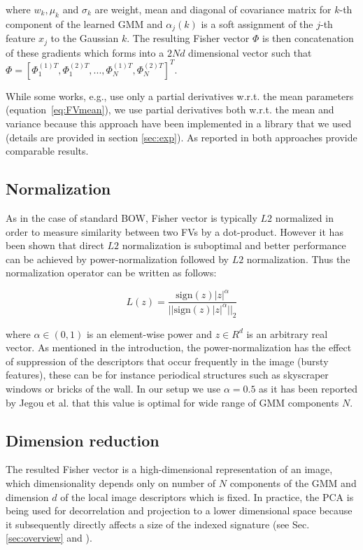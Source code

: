 \documentclass[table]{article} %
\newcommand\abs[1]{\left|#1\right|}
\newcommand\norm[1]{||#1||_2}
\begin{document}
		\noindent
		where $w_k, \mu_k$ and $\sigma_k$ are weight, mean and diagonal of covariance matrix for $k$-th component of the learned GMM and $\alpha_j(k)$ is a soft assignment of the $j$-th feature $x_j$ to the Gaussian $k$. The resulting Fisher vector  $\Phi$ is then concatenation of these gradients which forms into a $2Nd$ dimensional vector such that $\Phi=[\Phi^{(1)T}_1,\Phi^{(2)T}_1,...,\Phi^{(1)T}_N,\Phi^{(2)T}_N]^T$.

		While some works, e.g.\cite{Perronnin2010}, use only a partial derivatives w.r.t. the mean parameters (equation~\eqref{eq:FVmean}), we use partial derivatives both w.r.t. the mean and variance because this approach have been implemented in a library that we used (details are provided in section \ref{sec:exp}). As reported in \cite{Jegou2010} both approaches provide comparable results.

		\subsection{Normalization}
			As in the case of standard BOW, Fisher vector is typically $L2$ normalized in order to measure similarity between two FVs by a dot-product. However it has been shown that direct $L2$ normalization is suboptimal and better performance can be achieved by power-normalization followed by $L2$ normalization. Thus the normalization operator can be written as follows:
			
			\begin{equation}
				L(z)=\dfrac{\text{sign} (z) \abs{z}^\alpha}{\norm{\text{sign}(z) \abs{z}^\alpha}}
				\label{eq:Loperator}
			\end{equation}

			\noindent
			where $\alpha \in (0,1)$ is an element-wise power and $z \in R^d$ is an arbitrary real vector. As mentioned in the introduction, the power-normalization has the effect of suppression of the descriptors that occur frequently in the image (bursty features), these can be for instance periodical structures such as skyscraper windows or bricks of the wall. In our setup we use $\alpha=0.5$ as it has been reported by Jegou et al. \cite{Jegou2012HAL} that this value is optimal for wide range of GMM components $N$.

		\subsection{Dimension reduction}
			The resulted Fisher vector is a high-dimensional representation of an image, which dimensionality depends only on number of $N$ components of the GMM and dimension $d$ of the local image descriptors which is fixed. In practice, the PCA is being used for decorrelation and projection to a lower dimensional space because it subsequently directly affects a size of the indexed signature (see Sec. \ref{sec:overview} and \cite{Jegou2011}).
\end{document}
